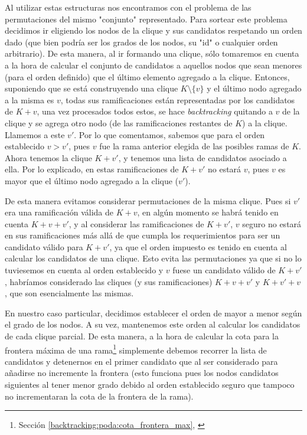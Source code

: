 \par Al utilizar estas estructuras nos encontramos
    con el problema de las permutaciones del mismo "conjunto" representado. Para sortear
    este problema decidimos ir eligiendo los nodos de la clique y sus candidatos respetando
    un orden dado (que bien podr\'ia ser los grados de los nodos, su "id" o cualquier orden
    arbitrario). De esta manera, al ir formando una clique, s\'olo tomaremos en cuenta a
    la hora de calcular el conjunto de candidatos a aquellos nodos que sean menores (para
    el orden definido) que el \'ultimo elemento agregado a la clique. Entonces, suponiendo
    que se est\'a construyendo una clique $K\setminus\{v\}$ y el \'ultimo nodo agregado a la misma es $v$,
    todas sus ramificaciones est\'an representadas por los candidatos de $K+v$, una vez
    procesados todos estos, se hace \emph{backtracking} quitando a $v$ de la clique y se
    agrega otro nodo (de las ramificaciones restantes de $K$) a la clique. Llamemos a este
    $v'$. Por lo que comentamos, sabemos que para el orden establecido $v > v'$, pues
    $v$ fue la rama anterior elegida de las posibles ramas de $K$. Ahora tenemos la
    clique $K+v'$, y tenemos una lista de candidatos asociado a ella. Por lo explicado,
    en estas ramificaciones de $K+v'$ no estar\'a $v$, pues $v$ es mayor que el \'ultimo
    nodo agregado a la clique ($v'$).

\par De esta manera evitamos considerar permutaciones de la misma clique. Pues si $v'$
    era una ramificaci\'on v\'alida de $K+v$, en alg\'un momento se habr\'a tenido
    en cuenta $K+v+v'$, y al considerar las ramificaciones de $K+v'$, $v$ seguro
    no estar\'a en sus ramificaciones m\'as all\'a de que cumpla los requerimientos
    para ser un candidato v\'alido para $K+v'$, ya que el orden impuesto es tenido
    en cuenta al calcular los candidatos de una clique. Esto evita las permutaciones ya
    que si no lo tuviesemos en cuenta al orden establecido y $v$ fuese un candidato
    v\'alido de $K+v'$, habr\'iamos considerado las cliques (y sus ramificaciones)
    $K+v+v'$ y $K+v'+v$, que son esencialmente las mismas.

\par En nuestro caso particular, decidimos establecer el orden de mayor a menor
    seg\'un el grado de los nodos. A su vez, mantenemos este orden al calcular
    los candidatos de cada clique parcial. De esta manera, a la hora de calcular
    la cota para la frontera m\'axima de una rama\footnote{Secci\'on
    \ref{backtracking:poda:cota_frontera_max},
    \emph{}}
    simplemente debemos recorrer la lista de candidatos y detenernos en el primer
    candidato que al ser considerado para a\~nadirse no incremente la frontera
    (esto funciona pues los nodos candidatos siguientes al tener menor grado
    debido al orden establecido seguro que tampoco no incrementaran la cota
    de la frontera de la rama). \label{orden_establecido}

